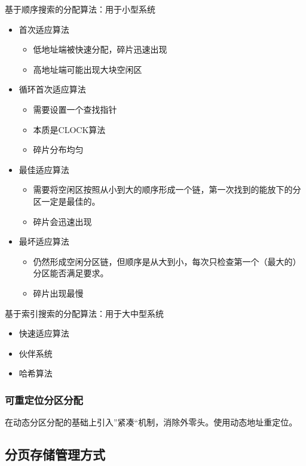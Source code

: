 \documentclass[12pt, a4paper, oneside]{ctexart}
\begin{document}
基于顺序搜索的分配算法：用于小型系统
\begin{itemize}
    \item 首次适应算法
    \begin{itemize}
        \item 低地址端被快速分配，碎片迅速出现
        \item 高地址端可能出现大块空闲区
    \end{itemize}
    \item 循环首次适应算法
    \begin{itemize}
        \item 需要设置一个查找指针
        \item 本质是CLOCK算法
        \item 碎片分布均匀
    \end{itemize}
    \item 最佳适应算法
    \begin{itemize}
        \item 需要将空闲区按照从小到大的顺序形成一个链，第一次找到的能放下的分区一定是最佳的。
        \item 碎片会迅速出现
    \end{itemize}
    \item 最坏适应算法
    \begin{itemize}
        \item 仍然形成空闲分区链，但顺序是从大到小，每次只检查第一个（最大的）分区能否满足要求。
        \item 碎片出现最慢
    \end{itemize}
\end{itemize}

基于索引搜索的分配算法：用于大中型系统
\begin{itemize}
    \item 快速适应算法
    \item 伙伴系统
    \item 哈希算法
\end{itemize}

\subsubsection{可重定位分区分配}

在动态分区分配的基础上引入”紧凑“机制，消除外零头。使用动态地址重定位。

\subsection{分页存储管理方式}
\end{document}
